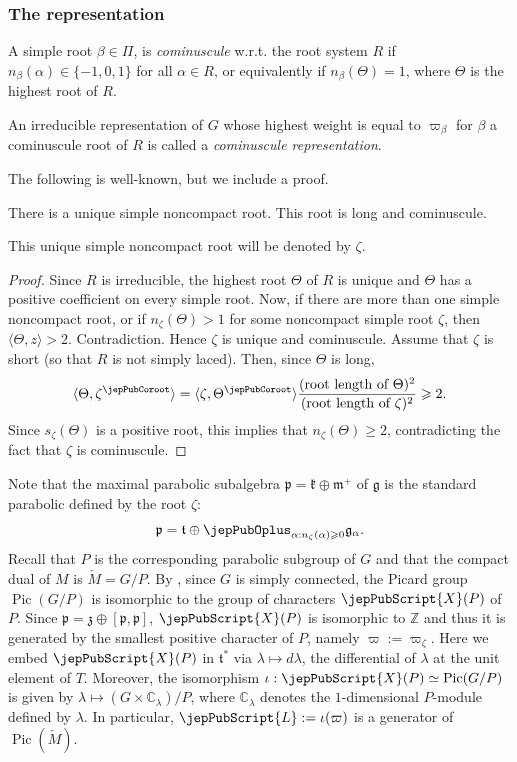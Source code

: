 \subsubsection{The representation}
\begin{definition}
A simple root $\beta\in\Pi$, is \emph{cominuscule} w.r.t. the root system $R$ if $n_\beta(\alpha)\in\{-1,0,1\}$ for all $\alpha\in R$, or equivalently if $n_\beta(\Theta)=1$, where $\Theta$ is the highest root of $R$.

An irreducible representation of $G$ whose highest weight is equal to $\varpi_\beta$ for $\beta$ a cominuscule root of $R$ is called a \emph{cominuscule representation}.
\end{definition}
The following is well-known, but we include a proof.
\begin{proposition}
There is a unique simple noncompact root. This root is long and cominuscule.
\end{proposition}
\begin{notation}
This unique simple noncompact root will be denoted by $\zeta$.
\end{notation}
\begin{proof}
Since $R$ is irreducible, the highest root $\Theta$ of $R$ is unique and $\Theta$ has a positive coefficient on every simple root. Now, if there are more than one simple noncompact root, or if $n_\zeta(\Theta)>1$ for some noncompact simple root $\zeta$, then $\langle\Theta,z\rangle>2$. Contradiction. Hence $\zeta$ is unique and cominuscule. Assume that $\zeta$ is short (so that $R$ is not simply laced). Then, since $\Theta$ is long,
\[
\langle\Theta,\zeta^\jepPubCoroot\rangle=\langle\zeta,\Theta^\jepPubCoroot\rangle\frac{(\text{root length of }\Theta)^2}{(\text{root length of }\zeta)^2}\geqslant2.
\]
Since $s_\zeta(\Theta)$ is a positive root, this implies that $n_\zeta(\Theta)\geqslant2$, contradicting the fact that $\zeta$ is cominuscule.
\end{proof}

Note that the maximal parabolic subalgebra $\mathfrak p=\mathfrak k\oplus\mathfrak m^+$ of $\mathfrak g$ is the standard parabolic defined by the root $\zeta$:
\[
\mathfrak p=\mathfrak t\oplus\jepPubOplus_{\alpha:n_\zeta(\alpha)\geqslant0}\mathfrak g_\alpha.
\]
Recall that $P$ is the corresponding parabolic subgroup of $G$ and that the compact dual of $M$ is $\check M=G/P$. By \cite{jep93Mur59}, since $G$ is simply connected, the Picard group $\operatorname{Pic}(G/P)$ is isomorphic to the group of characters $\jepPubScript{X}(P)$ of $P$. Since $\mathfrak p=\mathfrak z\oplus[\mathfrak p,\mathfrak p]$, $\jepPubScript{X}(P)$ is isomorphic to $\mathbb Z$ and thus it is generated by the smallest positive character of $P$, namely $\varpi:=\varpi_\zeta$. Here we embed $\jepPubScript{X}(P)$ in $\mathfrak t^*$ via $\lambda\mapsto d\lambda$, the differential of $\lambda$ at the unit element of $T$. Moreover, the isomorphism $\iota:\jepPubScript{X}(P)\simeq\operatorname{Pic}(G/P)$ is given by $\lambda\mapsto(G\times\mathbb C_\lambda)/P$, where $\mathbb C_\lambda$ denotes the $1$-dimensional $P$-module defined by $\lambda$. In particular, $\jepPubScript{L}:=\iota(\varpi)$ is a generator of $\operatorname{Pic}(\check M)$.


